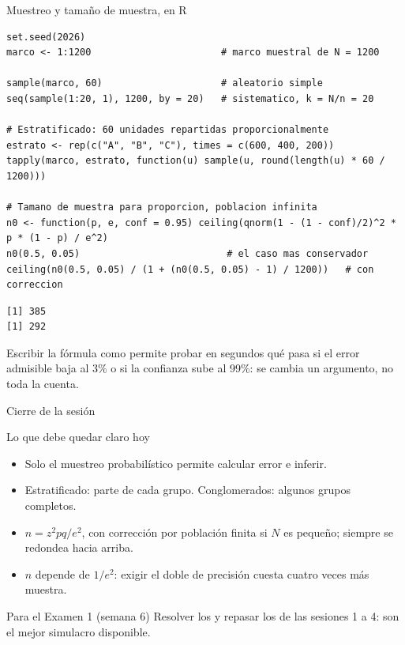 \documentclass[aspectratio=169,10pt]{beamer}
\begin{document}
\begin{frame}[fragile]{Muestreo y tamaño de muestra, en R}
  \scriptsize
\begin{lstlisting}[style=Rmini]
set.seed(2026)
marco <- 1:1200                       # marco muestral de N = 1200

sample(marco, 60)                     # aleatorio simple
seq(sample(1:20, 1), 1200, by = 20)   # sistematico, k = N/n = 20

# Estratificado: 60 unidades repartidas proporcionalmente
estrato <- rep(c("A", "B", "C"), times = c(600, 400, 200))
tapply(marco, estrato, function(u) sample(u, round(length(u) * 60 / 1200)))

# Tamano de muestra para proporcion, poblacion infinita
n0 <- function(p, e, conf = 0.95) ceiling(qnorm(1 - (1 - conf)/2)^2 * p * (1 - p) / e^2)
n0(0.5, 0.05)                          # el caso mas conservador
ceiling(n0(0.5, 0.05) / (1 + (n0(0.5, 0.05) - 1) / 1200))   # con correccion
\end{lstlisting}
\begin{lstlisting}[style=Rout]
[1] 385
[1] 292
\end{lstlisting}

  \vspace{-0.1cm}
  {\tiny\color{uniGris} Escribir la fórmula como  permite
  probar en segundos qué pasa si el error admisible baja al 3\% o si la
  confianza sube al 99\%: se cambia un argumento, no toda la cuenta.}
\end{frame}

\begin{frame}{Cierre de la sesión}
  \begin{block}{Lo que debe quedar claro hoy}
    \begin{itemize}
      \item Solo el muestreo probabilístico permite calcular error e inferir.
      \item Estratificado: parte de cada grupo. Conglomerados: algunos grupos
            completos.
      \item $n=z^{2}pq/e^{2}$, con corrección por población finita si $N$ es
            pequeño; siempre se redondea hacia arriba.
      \item $n$ depende de $1/e^{2}$: exigir el doble de precisión cuesta
            cuatro veces más muestra.
    \end{itemize}
  \end{block}

  \vspace{0.2cm}
  \begin{alertblock}{Para el Examen 1 (semana 6)}
    \footnotesize
    Resolver los  y repasar los
    de las sesiones 1 a 4: son el mejor simulacro disponible.
  \end{alertblock}
\end{frame}
\end{document}
